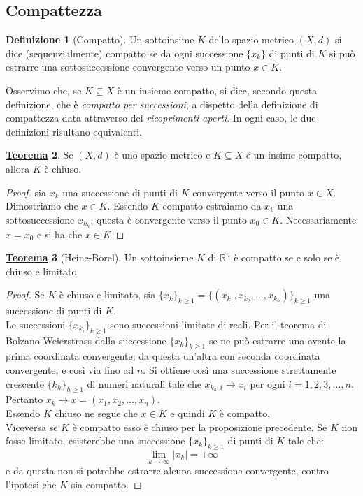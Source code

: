 \documentclass[a4paper,twoside]{article}
\newcommand{\R}{\mathbb{R}}
\theoremstyle{definition}
\newtheorem{theorem}{\color{Red}\underline{\textrm Teorema}}
\newenvironment{theo}
  {\begin{shaded}\begin{theorem}}
  {\end{theorem}\end{shaded}}
\newtheorem{definizione}[theorem]{Definizione}
\numberwithin{theorem}{section}
\begin{document}
\subsection{Compattezza}
\begin{definizione}[Compatto]
    Un sottoinsime $K$ dello spazio metrico $(X,d)$ si dice (sequenzialmente) compatto se da ogni successione $\{x_k\}$ di punti di $K$ si può estrarre una sottosuccessione convergente verso un punto $x\in K$.
\end{definizione}
Osservimo che, se $K\subseteq X$ è un insieme compatto, si dice, secondo questa definizione, che è \emph{compatto per successioni}, a dispetto della definizione di compattezza data attraverso dei \emph{ricoprimenti aperti}. In ogni caso, le due definizioni risultano equivalenti.
\begin{theorem}
    Se $(X,d)$ è uno spazio metrico e $K\subseteq X$ è un insime compatto, allora $K$ è chiuso.
\end{theorem}
\begin{proof}
    sia $x_k$ una successione di punti di $K$ convergente verso il punto $x\in X$. Dimostriamo che $x\in K$. Essendo $K$ compatto estraiamo da $x_k$ una sottosuccessione $x_{k_h}$, questa è convergente verso il punto $x_0\in K$. Necessariamente $x=x_0$ e si ha che $x\in K$
\end{proof}
\begin{theo}[Heine-Borel]
Un sottoinsieme $K$ di $\R^n$ è compatto se e solo se è chiuso e limitato.    
\end{theo}
\begin{proof}
 Se $K$ è chiuso e limitato, sia $\{x_k\}_{k\geq 1}=\{\left(x_{k_1},x_{k_2},\dots,x_{k_n}\right)\}_{k\geq 1}$ una successione di punti di $K$.\\ Le successioni $\{x_{k_i}\}_{k\geq 1}$ sono successioni limitate di reali. Per il teorema di Bolzano-Weierstrass dalla successione $\{x_k\}_{k\geq 1}$ se ne può estrarre una avente la prima coordinata convergente; da questa un'altra con seconda coordinata convergente, e così via fino ad $n$. Si ottiene così una successione strettamente crescente $\{k_h\}_{h\geq 1}$ di numeri naturali tale che  $x_{k_h,i}\to x_i$ per ogni $i=1,2,3,\dots,n$. Pertanto $x_k\to x=(x_1,x_2,\dots,x_n)$.\\
 Essendo $K$ chiuso ne segue che $x\in K$ e quindi $K$ è compatto.\\ Viceversa se $K$ è compatto esso è chiuso per la proposizione precedente. Se $K$ non fosse limitato, esisterebbe una successione $\{x_k\}_{k\geq 1}$ di punti di $K$ tale che: $$\lim_{k\to\infty}|x_k|=+\infty$$ e da questa non si potrebbe estrarre alcuna successione convergente, contro l'ipotesi che $K$ sia compatto.
\end{proof}
\end{document}
